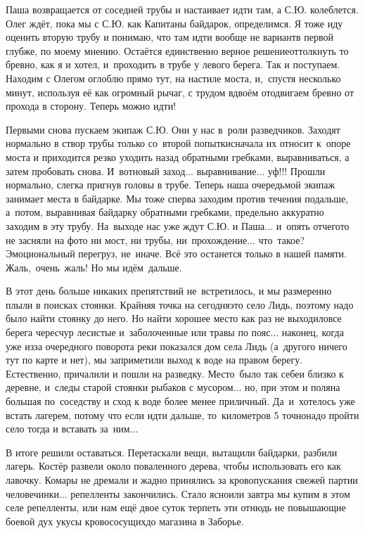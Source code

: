 Паша возвращается от соседней трубы и настаивает идти там, а С.Ю. колеблется. Олег ждёт, пока мы с С.Ю. как Капитаны байдарок, определимся. Я тоже иду оценить вторую трубу и понимаю, что там идти вообще не вариант\mdash в первой глубже, по моему мнению. Остаётся единственно верное решение\mdash оттолкнуть то бревно, как я и хотел, и~проходить в трубе у левого берега. Так и поступаем. Находим с Олегом оглоблю прямо тут, на настиле моста, и,~спустя несколько минут, используя её как огромный рычаг, с трудом вдвоём отодвигаем бревно от прохода в сторону. Теперь можно идти! 

Первыми снова пускаем экипаж С.Ю. Они у нас в~роли разведчиков. Заходят нормально в створ трубы только со~второй попытки\mdash сначала их относит к~опоре моста и приходится резко уходить назад обратными гребками, выравниваться, а затем пробовать снова. И~вот\mdash новый заход$\ldots$ выравнивание$\ldots$ уф!!! Прошли нормально, слегка пригнув головы в трубе. Теперь наша очередь\mdash мой экипаж занимает места в байдарке. Мы тоже сперва заходим против течения подальше, а~потом, выравнивая байдарку обратными гребками, предельно аккуратно заходим в эту трубу. На~выходе нас уже ждут С.Ю. и Паша$\ldots$ и~опять отчего\sdash то не засняли на фото ни мост, ни трубы, ни~прохождение$\ldots$ что~такое? Эмоциональный перегруз, не~иначе. Всё это останется только в нашей памяти. Жаль,~очень~жаль! Но мы идём~дальше.

В этот день больше никаких препятствий не~встретилось, и мы размеренно плыли в поисках стоянки. Крайняя точка на сегодня\mdash это село Лидь, поэтому надо было найти стоянку до него. Но найти хорошее место как раз не выходило\mdash все берега чересчур лесистые и~заболоченные или травы по пояс$\ldots$ наконец, когда уже из\sdash за очередного поворота реки показался дом села Лидь (а~другого ничего тут по карте и нет), мы заприметили выход к воде на правом берегу. Естественно, причалили и пошли на разведку. Место~было так себе\mdash и близко к деревне, и~следы старой стоянки рыбаков с мусором$\ldots$ но, при этом и поляна большая по~соседству и сход к воде более менее приличный. Да~и~хотелось уже встать лагерем, потому что если идти дальше, то~километров 5 точно\mdash надо пройти село тогда и вставать за~ним$\ldots$

В итоге решили оставаться. Перетаскали вещи, вытащили байдарки, разбили лагерь. Костёр развели около поваленного дерева, чтобы использовать его как лавочку. Комары не дремали и жадно принялись за кровопускания свежей партии человечинки$\ldots$ репелленты закончились. Стало ясно\mdash или завтра мы купим в этом селе репелленты, или нам ещё двое суток терпеть эти отнюдь не повышающие боевой дух укусы кровососущих\mdash до магазина в Заборье.


